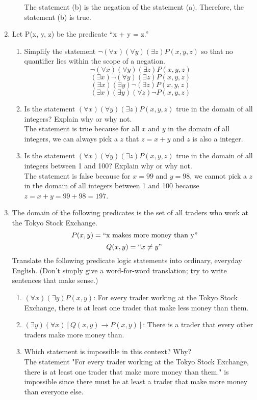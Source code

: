 \documentclass[12pt]{article}
\begin{document}
\begin{enumerate}
\begin{enumerate}
                        The statement (b) is the negation of the statement (a). Therefore, the statement (b) is true.
            \end{enumerate}
      \item Let P(x, y, z) be the predicate “x + y = z.”
            \begin{enumerate}
                  \item Simplify the statement $\neg (\forall x)(\forall y)(\exists z)P(x,y,z)$ so that no quantifier lies within the scope of a negation.
                        \[\neg (\forall x)(\forall y)(\exists z)P(x,y,z)\]
                        \[ (\exists x)\neg(\forall y)(\exists z)P(x,y,z)\]
                        \[ (\exists x)(\exists y)\neg(\exists z)P(x,y,z)\]
                        \[ (\exists x)(\exists y)(\forall z)\neg P(x,y,z)\]
                  \item Is the statement $(\forall x)(\forall y)(\exists z)P(x,y,z)$ true in the domain of all integers? Explain why or why not.\\
                        The statement is true because for all $x$ and $y$ in the domain of all integers, we can always pick a $z$ that $z = x + y$ and $z$ is also a integer.
                  \item Is the statement $(\forall x)(\forall y)(\exists z)P(x,y,z)$ true in the domain of all integers between 1 and 100? Explain why or why not.\\
                        The statement is false because for $x = 99$ and $y = 98$, we cannot pick a $z$ in the domain of all integers between 1 and 100 because $z = x + y = 99 + 98 = 197$.
            \end{enumerate}
            \newpage
      \item The domain of the following predicates is the set of all traders who work at the Tokyo Stock Exchange.
            \[P(x,y) = \text{\textquotedblleft} \text{x makes more money than y} \text{\textquotedblright}\]
            \[Q(x,y) = \text{\textquotedblleft} x \neq y \text{\textquotedblright}\]
            Translate the following predicate logic statements into ordinary, everyday English. (Don’t simply give a word-for-word translation; try to write sentences that make sense.)
            \begin{enumerate}
                  \item $(\forall x)(\exists y)P(x,y)$: For every trader working at the Tokyo Stock Exchange, there is at least one trader that make less money than them.
                  \item $(\exists y)(\forall x)[Q(x,y) \rightarrow P(x,y)]$: There is a trader that every other traders make more money than.
                  \item Which statement is impossible in this context? Why? \\
                        The statement "For every trader working at the Tokyo Stock Exchange, there is at least one trader that make more money than them." is impossible since there must be at least a trader that make more money than everyone else.
            \end{enumerate}


\end{enumerate}
\end{document}
